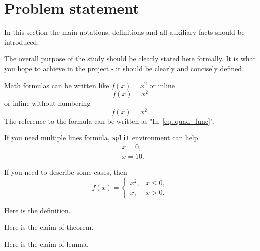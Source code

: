 \chapter{Problem statement}

In this section the main notations, definitions and all auxiliary facts should be introduced.

The overall purpose of the study should be clearly stated here formally.
It is what you hope to achieve in the project - it should be clearly and concisely defined.

Math formulas can be written like $f(x) = x^2$ or inline
\begin{equation}
    f(x) = x^2
    \label{eq::quad_func}
\end{equation}
or inline without numbering
\begin{equation*}
    f(x) = x^2.
\end{equation*}
The reference to the formula can be written as "In~\eqref{eq::quad_func}".

If you need multiple lines formula, \texttt{split} environment can help
\begin{equation*}
    \begin{split}
        & x = 0,\\
        & x = 10.
    \end{split}
\end{equation*}

If you need to describe some cases, then
\begin{equation*}
    f(x) = 
    \begin{cases}
      x^2, & x \leq 0,\\
      x, & x > 0.
    \end{cases}
\end{equation*}

\begin{Def}
  Here is the definition.
\end{Def}

\begin{Th}
  Here is the claim of theorem.
\end{Th}

\begin{Lem}
  Here is the claim of lemma.
\end{Lem}

